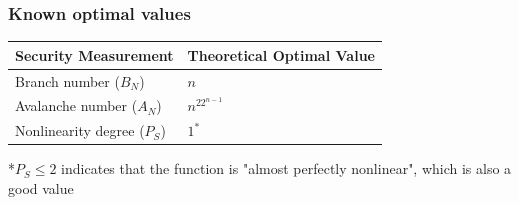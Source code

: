 \documentclass[handout]{beamer}
\newcommand{\field}[1]{\mathbb{#1}} %
\begin{document}

\begin{frame}
	\frametitle{Known optimal values}
\begin{table}
    \begin{tabular}{|l|l|}
        \hline
        \textbf{Security Measurement} & \textbf{Theoretical Optimal Value} \\ \hline
        Branch number ($B_N$) & $n$ \\ 
        Avalanche number ($A_N$) & $n^22^{n-1}$ \\ 
        Nonlinearity degree ($P_S$) & $1^*$ \\
        \hline
    \end{tabular}
\end{table}
*$P_S \leq 2$ indicates that the function is "almost perfectly nonlinear", which is also a good value
\end{frame}
\end{document}

